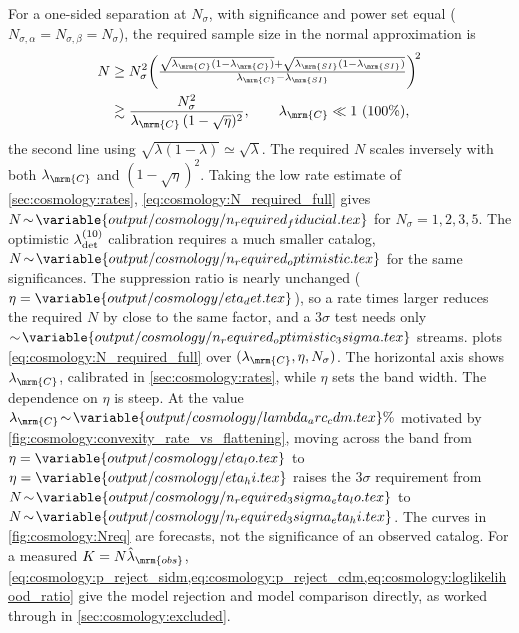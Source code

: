 \documentclass[linenumbers,twocolumn]{aastex701}
\newcommand{\lamC}{\ensuremath{\lambda_{\mrm{C}}}}    %
\newcommand{\lamSI}{\ensuremath{\lambda_{\mrm{SI}}}}  %
\newcommand{\lamObs}{\ensuremath{\hat{\lambda}_{\mrm{obs}}}}  %
\newcommand{\lamdadet}[1]{\ensuremath{\lambda_{\rm det}^{({#1})}}}
\newcommand{\lamCval}{\variable{output/cosmology/lambda_arc_cdm.tex}\%}
\begin{document}
        For a one-sided separation at $N_\sigma$, with significance and power set equal ($N_{\sigma,\alpha}=N_{\sigma,\beta}=N_\sigma$), the required sample size in the normal approximation is \citep[e.g.,][]{Fleiss+:2003:StatisticalMethodsRates}
        \begin{align}
            N
            &\ge
                N_\sigma^2\!\left(\tfrac{\sqrt{\lamC(1-\lamC)}+\sqrt{\lamSI(1-\lamSI)}}{\lamC-\lamSI}\right)^{\!2}
                \label{eq:cosmology:N_required_full} \\
            &\gtrsim
                \frac{N_\sigma^2}{\lamC\,(1-\sqrt{\eta})^{2}},
                \qquad \lamC\ll 1 \ (100\%),
                \label{eq:cosmology:N_required} %
        \end{align}
        the second line using $\sqrt{\lambda(1-\lambda)}\simeq\sqrt{\lambda}$. %
        The required $N$ scales inversely with both $\lamC$ and $(1-\sqrt{\eta})^{2}$. %
        Taking the low rate estimate of \autoref{sec:cosmology:rates}, \cref{eq:cosmology:N_required_full} gives $N\!\sim\!\variable{output/cosmology/n_required_fiducial.tex}$ for $N_\sigma=1,2,3,5$. %
        The optimistic $\lamdadet{10}$ calibration requires a much smaller catalog, $N\!\sim\!\variable{output/cosmology/n_required_optimistic.tex}$ for the same significances. %
        The suppression ratio is nearly unchanged ($\eta=\variable{output/cosmology/eta_det.tex}$), so a rate  times larger reduces the required $N$ by close to the same factor, and a $3\sigma$ test needs only $\sim\!\variable{output/cosmology/n_required_optimistic_3sigma.tex}$ streams. %
         plots \cref{eq:cosmology:N_required_full} over $(\lamC,\eta,N_\sigma)$. %
        The horizontal axis shows $\lamC$, calibrated in \autoref{sec:cosmology:rates}, while $\eta$ sets the band width. %
        The dependence on $\eta$ is steep. %
        At the value $\lamC\!\sim\!\lamCval$ motivated by \autoref{fig:cosmology:convexity_rate_vs_flattening}, moving across the band from $\eta=\variable{output/cosmology/eta_lo.tex}$ to $\eta=\variable{output/cosmology/eta_hi.tex}$ raises the $3\sigma$ requirement from $N\!\sim\!\variable{output/cosmology/n_required_3sigma_eta_lo.tex}$ to $N\!\sim\!\variable{output/cosmology/n_required_3sigma_eta_hi.tex}$. %
        The curves in \cref{fig:cosmology:Nreq} are forecasts, not the significance of an observed catalog. %
        For a measured $K=N\lamObs$, \cref{eq:cosmology:p_reject_sidm,eq:cosmology:p_reject_cdm,eq:cosmology:loglikelihood_ratio} give the model rejection and model comparison directly, as worked through in \autoref{sec:cosmology:excluded}. %
\end{document}
